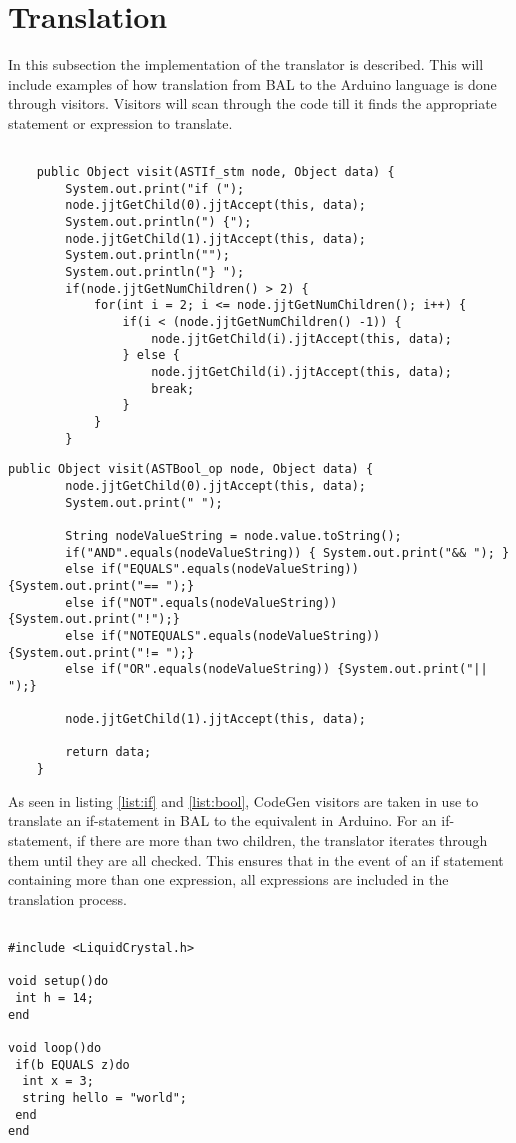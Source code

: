 \section{Translation}
In this subsection the implementation of the translator is described. This will include examples of how translation from BAL to the Arduino language is done through visitors.
Visitors will scan through the code till it finds the appropriate statement or expression to translate.

\begin{lstlisting}[caption=Visitor for translation of an if-statement, label=list:if]

	public Object visit(ASTIf_stm node, Object data) {
		System.out.print("if (");
		node.jjtGetChild(0).jjtAccept(this, data);
		System.out.println(") {");
		node.jjtGetChild(1).jjtAccept(this, data);
		System.out.println("");
		System.out.println("} ");
		if(node.jjtGetNumChildren() > 2) {
			for(int i = 2; i <= node.jjtGetNumChildren(); i++) {
				if(i < (node.jjtGetNumChildren() -1)) {
					node.jjtGetChild(i).jjtAccept(this, data);
				} else {
					node.jjtGetChild(i).jjtAccept(this, data);
					break;
				}
			}
		}

\end{lstlisting}

\begin{lstlisting}[caption=Visitor for translation of an boolean operators, label=list:bool]
	public Object visit(ASTBool_op node, Object data) {
		node.jjtGetChild(0).jjtAccept(this, data);
		System.out.print(" ");

		String nodeValueString = node.value.toString();
		if("AND".equals(nodeValueString)) { System.out.print("&& "); }
		else if("EQUALS".equals(nodeValueString)) {System.out.print("== ");}
		else if("NOT".equals(nodeValueString)) {System.out.print("!");}
		else if("NOTEQUALS".equals(nodeValueString)) {System.out.print("!= ");}
		else if("OR".equals(nodeValueString)) {System.out.print("|| ");}

		node.jjtGetChild(1).jjtAccept(this, data);

		return data;
	}
\end{lstlisting}

As seen in listing \ref{list:if} and  \ref{list:bool}, CodeGen visitors are taken in use to translate an if-statement in BAL to the equivalent in Arduino. For an if-statement, if there are more than two children, the translator iterates through them until they are all checked. This ensures that in the event of an if statement containing more than one expression, all expressions are included in the translation process.\\
\begin{lstlisting}[caption=Example of an if-statement written in BAL, label=list:phstmt]

#include <LiquidCrystal.h>

void setup()do
 int h = 14;
end

void loop()do
 if(b EQUALS z)do
  int x = 3;
  string hello = "world";
 end
end
\end{lstlisting}

